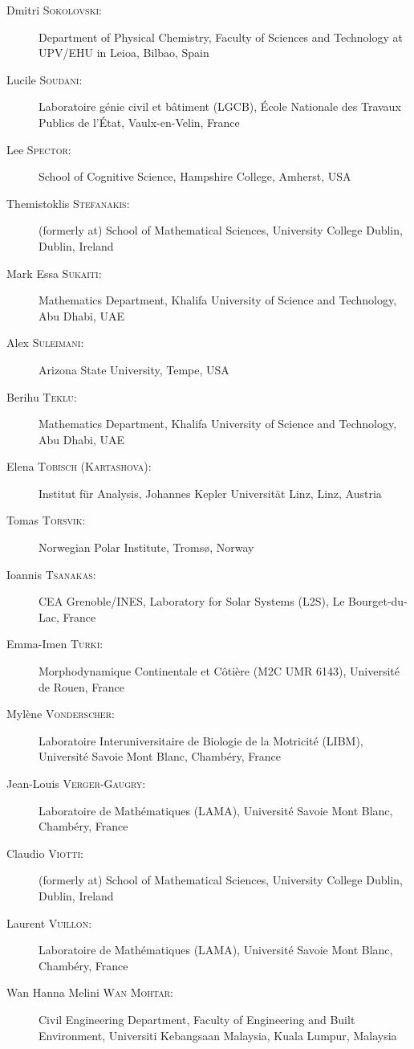 \documentclass[final, a4paper, oneside, 12pt]{article}
\numberwithin{equation}{section}
\begin{document}
\begin{description}
  \item[Dmitri \textsc{Sokolovski}:] Department of Physical Chemistry, Faculty of Sciences and Technology at UPV/EHU in Leioa, Bilbao, Spain
  \item[Lucile \textsc{Soudani}:] Laboratoire g\'enie civil et b\^atiment (LGCB), \'Ecole Nationale des Travaux Publics de l'\'Etat, Vaulx-en-Velin, France
  \item[Lee \textsc{Spector}:] School of Cognitive Science, Hampshire College, Amherst, USA
  \item[Themistoklis \textsc{Stefanakis}:] (formerly at) School of Mathematical Sciences, University College Dublin, Dublin, Ireland
  \item[Mark Essa \textsc{Sukaiti}:] Mathematics Department, Khalifa University of Science and Technology, Abu Dhabi, UAE
  \item[Alex \textsc{Suleimani}:] Arizona State University, Tempe, USA
  \item[Berihu \textsc{Teklu}:] Mathematics Department, Khalifa University of Science and Technology, Abu Dhabi, UAE
  \item[Elena \textsc{Tobisch} (\textsc{Kartashova}):] Institut f\"ur Analysis, Johannes Kepler Universit\"at Linz, Linz, Austria
  \item[Tomas \textsc{Torsvik}:] Norwegian Polar Institute, Troms\o, Norway
  \item[Ioannis \textsc{Tsanakas}:] CEA Grenoble/INES, Laboratory for Solar Systems (L2S), Le Bourget-du-Lac, France
  \item[Emma-Imen \textsc{Turki}:] Morphodynamique Continentale et C\^oti\`ere (M2C UMR 6143), Universit\'e de Rouen, France
  \item[Myl\`ene \textsc{Vonderscher}:] Laboratoire Interuniversitaire de Biologie de la Motricit\'e (LIBM), Universit\'e Savoie Mont Blanc, Chamb\'ery, France
  \item[Jean-Louis \textsc{Verger-Gaugry}:] Laboratoire de Math\'ematiques (LAMA), Universit\'e Savoie Mont Blanc, Chamb\'ery, France
  \item[Claudio \textsc{Viotti}:] (formerly at) School of Mathematical Sciences, University College Dublin, Dublin, Ireland
  \item[Laurent \textsc{Vuillon}:] Laboratoire de Math\'ematiques (LAMA), Universit\'e Savoie Mont Blanc, Chamb\'ery, France
  \item[Wan Hanna Melini \textsc{Wan Mohtar}:] Civil Engineering Department, Faculty of Engineering and Built Environment, Universiti Kebangsaan Malaysia, Kuala Lumpur, Malaysia

\end{description}
\end{document}

